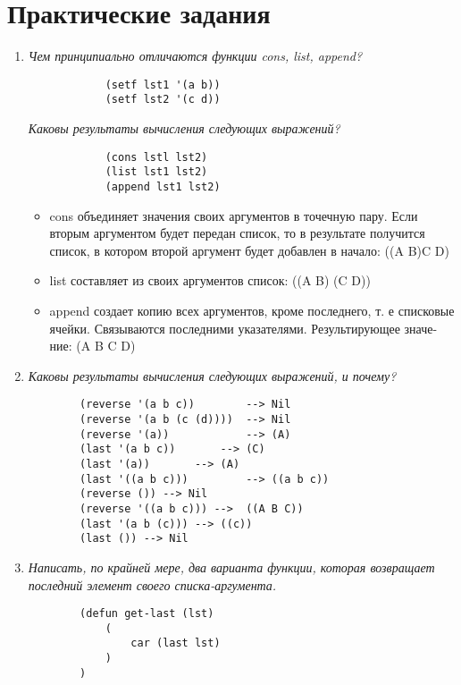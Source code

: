 \chapter{Практические задания}

\begin{enumerate}[wide=0pt]

	\item \textit{Чем принципиально отличаются функции cons, list, append?}

		\begin{lstlisting}
			(setf lst1 '(a b))
			(setf lst2 '(c d))
		\end{lstlisting}

		\textit{Каковы результаты вычисления следующих выражений?}
		\begin{lstlisting}
			(cons lstl lst2)
			(list lst1 lst2)
			(append lst1 lst2)
		\end{lstlisting}

		\begin{itemize}
			\item cons объединяет значения своих аргументов в точечную пару. Если вторым
			аргументом будет передан список, то в результате получится список, в
			котором второй аргумент будет добавлен в начало: ((A B)C D)

			\item list составляет из своих аргументов список: ((A B) (C D))
			\item append создает копию всех аргументов, кроме последнего, т. е списковые
			ячейки. Связываются последними указателями. Результирующее значе-
			ние: (A B C D)
		\end{itemize}


	\item  \textit{Каковы результаты вычисления следующих выражений, и почему?}

	\begin{lstlisting}
		(reverse '(a b c)) 		  --> Nil
		(reverse '(a b (c (d))))  --> Nil
		(reverse '(a)) 			  --> (A)
		(last '(a b c)) 	  --> (C) 
		(last '(a)) 	  --> (A)
		(last '((a b c)))         --> ((a b c))
		(reverse ()) --> Nil
		(reverse '((a b c))) -->  ((A B C))
		(last '(a b (c))) --> ((c))
		(last ()) --> Nil
	\end{lstlisting}

	\item  \textit{Написать, по крайней мере, два варианта функции, 
	которая возвращает
	последний элемент своего списка-аргумента.}

	\begin{lstlisting}
		(defun get-last (lst)
			(
				car (last lst)
			)
		)
	\end{lstlisting}


\end{enumerate}
